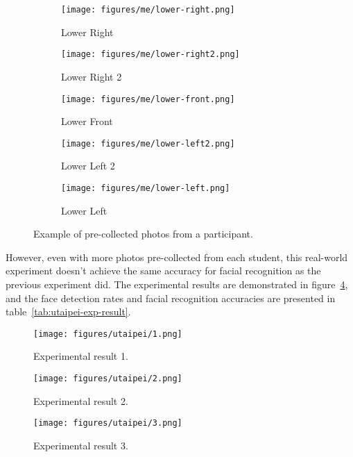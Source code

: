 \begin{figure}[!htb]
   \begin{subfigure}[b]{0.18\linewidth}
    \texttt{[image: figures/me/lower-right.png]}
    \caption{Lower Right}
  \end{subfigure}
  \begin{subfigure}[b]{0.18\linewidth}
    \texttt{[image: figures/me/lower-right2.png]}
    \caption{Lower Right 2}
  \end{subfigure}
  \begin{subfigure}[b]{0.18\linewidth}
    \texttt{[image: figures/me/lower-front.png]}
    \caption{Lower Front}
  \end{subfigure}
  \begin{subfigure}[b]{0.18\linewidth}
    \texttt{[image: figures/me/lower-left2.png]}
    \caption{Lower Left 2}
  \end{subfigure}
  \begin{subfigure}[b]{0.18\linewidth}
    \texttt{[image: figures/me/lower-left.png]}
    \caption{Lower Left}
  \end{subfigure}
  \caption{Example of pre-collected photos from a participant.}
  \label{fig:precollect-example}
\end{figure}
\vspace{0.5cm}

However, even with more photos pre-collected from each student,
this real-world experiment doesn't achieve the same accuracy for facial recognition
as the previous experiment did. The experimental results are demonstrated in figure~\ref{fig:utaipei-exp-result},
and the face detection rates and facial recognition accuracies are presented in table~\ref{tab:utaipei-exp-result}.
\vspace{0.5cm}

\begin{figure}[!htb]
  \centering
  \texttt{[image: figures/utaipei/1.png]}
  \caption{Experimental result 1.}
  \label{fig:utaipei-exp-result}
\end{figure}
\newpage

\begin{figure}[!htb]
  \centering
  \texttt{[image: figures/utaipei/2.png]}
  \caption{Experimental result 2.}
  \label{fig:utaipei-exp-result}
\end{figure}
\vspace{0.5cm}

\begin{figure}[!htb]
  \centering
  \texttt{[image: figures/utaipei/3.png]}
  \caption{Experimental result 3.}
  \label{fig:utaipei-exp-result}
\end{figure}
\newpage

